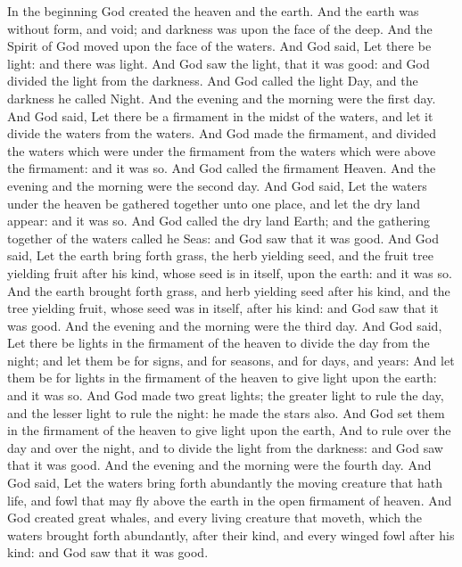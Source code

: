 
\begin{biblechapter} %
 In the beginning God created the heaven and the earth.
\verse And the earth was without form, and void; and darkness was upon the face of the deep. And the Spirit of God moved upon the face of the waters.
\verse And God said, Let there be light: and there was light.
\verse And God saw the light, that it was good: and God divided the light from the darkness.
\verse And God called the light Day, and the darkness he called Night. And the evening and the morning were the first day.
\verse And God said, Let there be a firmament in the midst of the waters, and let it divide the waters from the waters.
\verse And God made the firmament, and divided the waters which were under the firmament from the waters which were above the firmament: and it was so.
\verse And God called the firmament Heaven. And the evening and the morning were the second day.
\verse And God said, Let the waters under the heaven be gathered together unto one place, and let the dry land appear: and it was so.
\verse And God called the dry land Earth; and the gathering together of the waters called he Seas: and God saw that it was good.
\verse And God said, Let the earth bring forth grass, the herb yielding seed, and the fruit tree yielding fruit after his kind, whose seed is in itself, upon the earth: and it was so.
\verse And the earth brought forth grass, and herb yielding seed after his kind, and the tree yielding fruit, whose seed was in itself, after his kind: and God saw that it was good.
\verse And the evening and the morning were the third day.
\verse And God said, Let there be lights in the firmament of the heaven to divide the day from the night; and let them be for signs, and for seasons, and for days, and years:
\verse And let them be for lights in the firmament of the heaven to give light upon the earth: and it was so.
\verse And God made two great lights; the greater light to rule the day, and the lesser light to rule the night: he made the stars also.
\verse And God set them in the firmament of the heaven to give light upon the earth,
\verse And to rule over the day and over the night, and to divide the light from the darkness: and God saw that it was good.
\verse And the evening and the morning were the fourth day.
\verse And God said, Let the waters bring forth abundantly the moving creature that hath life, and fowl that may fly above the earth in the open firmament of heaven.
\verse And God created great whales, and every living creature that moveth, which the waters brought forth abundantly, after their kind, and every winged fowl after his kind: and God saw that it was good.

\end{biblechapter}
